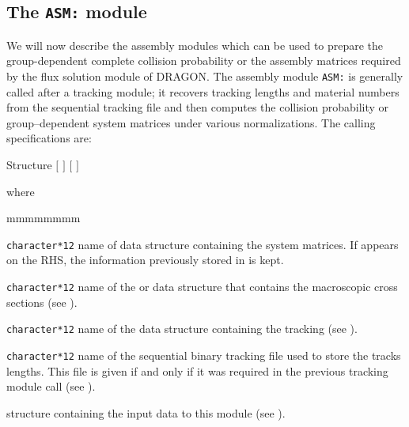 \subsection{The {\tt ASM:} module}\label{sect:ASMData}

We will now describe the assembly modules which can be used to prepare the
group-dependent complete collision probability or the assembly matrices required
by the flux solution module of DRAGON.  The assembly module {\tt ASM:} is
generally called after a tracking module; it recovers tracking lengths and
material numbers from the sequential tracking file and then computes the
collision probability or group--dependent system matrices under various
normalizations. The calling specifications are:

\begin{DataStructure}{Structure }
 \moc{:=}  $[$  $]$  
 $[$  $]$ \moc{::} 
\end{DataStructure}

\noindent where
\begin{ListeDeDescription}{mmmmmmmm}

\item[\dusa{PIJNAM}] {\tt character*12} name of  data
structure containing the system matrices. If  appears on the RHS,
the  information previously stored in  is kept.

\item[\dusa{LIBNAM}] {\tt character*12} name of the  or
 data structure that contains the
macroscopic cross sections (see ).

\item[\dusa{TRKNAM}] {\tt character*12} name of the  data
structure containing the tracking (see ).

\item[\dusa{TRKFIL}] {\tt character*12} name of the sequential binary tracking
file used to store the tracks lengths. This file is given if and only if it was
required in the previous tracking module call (see ).

\item[\dstr{descasm}] structure containing the input data to this module (see
).

\end{ListeDeDescription}

